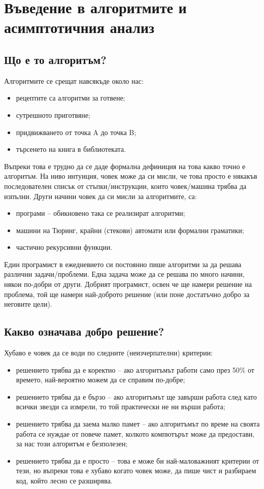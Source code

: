 \chapter{Въведение в алгоритмите и асимптотичния анализ}

\section{Що е то алгоритъм?}

Алгоритмите се срещат навсякъде около нас:
\begin{itemize}
  \item рецептите са алгоритми за готвене;
  \item сутрешното приготвяне;
  \item придвижването от точка A до точка B;
  \item търсенето на книга в библиотеката.
\end{itemize}

Въпреки това е трудно да се даде формална дефиниция на това какво точно е алгоритъм.
На ниво интуиция, човек може да си мисли, че това просто е някакъв последователен списък от стъпки/инструкции, които човек/машина трябва да изпълни.
Други начини човек да си мисли за алгоритмите, са:
\begin{itemize}
  \item програми -- обикновено така се реализират алгоритми;
  \item машини на Тюринг, крайни (стекови) автомати или формални граматики;
  \item частично рекурсивни функции.
\end{itemize}

Един програмист в ежедневието си постоянно пише алгоритми за да решава различни задачи/проблеми.
Една задача може да се решава по много начини, някои по-добри от други.
Добрият програмист, освен че ще намери решение на проблема, той ще намери най-доброто решение (или поне достатъчно добро за неговите цели).

\section{Какво означава добро решение?}

Хубаво е човек да се води по следните (неизчерпателни) критерии:
\begin{itemize}
  \item решението трябва да е коректно -- ако алгоритъмът работи само през 50\% от времето, най-вероятно можем да се справим по-добре;
  \item решението трябва да е бързо -- ако алгоритъмът ще завърши работа след като всички звезди са измрели, то той практически не ни върши работа;
  \item решението трябва да заема малко памет -- ако алгоритъмът по време на своята работа се нуждае от повече памет, колкото компютърът може да предостави, за нас този алгоритъм е безполезен;
  \item решението трябва да е просто -- това е може би най-маловажният критерии от тези, но въпреки това е хубаво когато човек може, да пише чист и разбираем код, който лесно се разширява.
\end{itemize}

